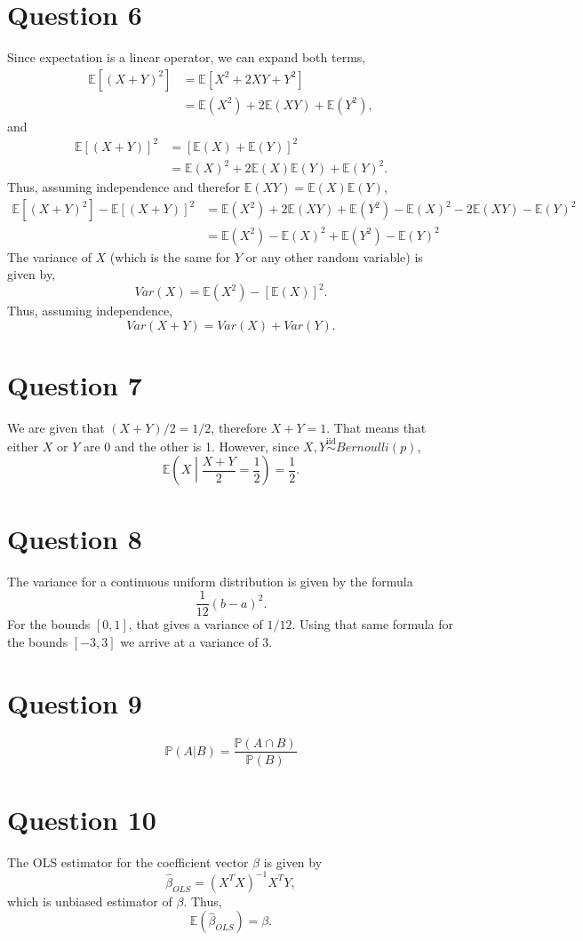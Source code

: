 \documentclass[titlepage, 12pt, leqno]{article}
\begin{document}
\section*{Question 6}
Since expectation is a linear operator, we can expand both terms,
\begin{align*}
    \mathbb{E}[(X+Y)^{2}] &= \mathbb{E}[X^{2} + 2XY + Y^{2}] \\
                          &= \mathbb{E}(X^{2}) + 2\mathbb{E}(XY) + 
                          \mathbb{E}(Y^{2}),
\end{align*}
and
\begin{align*}
    \mathbb{E}[(X+Y)]^{2} &= [\mathbb{E}(X) + \mathbb{E}(Y)]^{2} \\
                          &= \mathbb{E}(X)^{2} + 2\mathbb{E}(X)\mathbb{E}(Y) + 
                          \mathbb{E}(Y)^{2}.
\end{align*}
Thus, assuming independence and therefor $\mathbb{E}(XY) = \mathbb{E}(X)
\mathbb{E}(Y)$,
\begin{align*}
    \mathbb{E}[(X+Y)^{2}] - \mathbb{E}[(X+Y)]^{2} &= \mathbb{E}(X^{2}) + 
    2\mathbb{E}(XY)  + \mathbb{E}(Y^{2}) - \mathbb{E}(X)^{2} - 2\mathbb{E}(XY)
    - \mathbb{E}(Y)^{2} \\
    &= \mathbb{E}(X^{2}) - \mathbb{E}(X)^{2} + \mathbb{E}(Y^{2}) -
    \mathbb{E}(Y)^{2}
\end{align*}
The variance of $X$ (which is the same for $Y$ or any other random 
variable) is given by,
\[
Var(X) = \mathbb{E}(X^{2}) - [\mathbb{E}(X)]^{2}.
\]
Thus, assuming independence,
\[
Var(X+Y) = Var(X) + Var(Y).
\]

\section*{Question 7}
We are given that $(X+Y)/2 = 1/2$, therefore $X + Y = 1$. That means that either
 $X$ or $Y$ are 0 and the other is 1. However, since 
 $X,Y\overset{\mathrm{iid}}{\sim}Bernoulli(p)$,
\[
\mathbb{E}\left(X \middle| \frac{X+Y}{2} = \frac{1}{2}\right) = \frac{1}{2}.
\]

\section*{Question 8}
The variance for a continuous uniform distribution is given by the formula
\[
\frac{1}{12}(b-a)^{2}.
\]
For the bounds $[0,1]$, that gives a variance of $1/12$. Using that same
formula for the bounds $[-3,3]$ we arrive at a variance of 3.

\section*{Question 9}
\[
\mathbb{P}(A|B) = \frac{\mathbb{P}(A \cap B)}{\mathbb{P}(B)}
\]

\section*{Question 10}
The OLS estimator for the coefficient vector $\beta$ is given by
\[
\hat \beta_{OLS} = (X^{T}X)^{-1}X^{T}Y,
\]
which is unbiased estimator of $\beta$. Thus,
\[
\mathbb{E}(\hat \beta_{OLS}) = \beta.
\]
\end{document}
